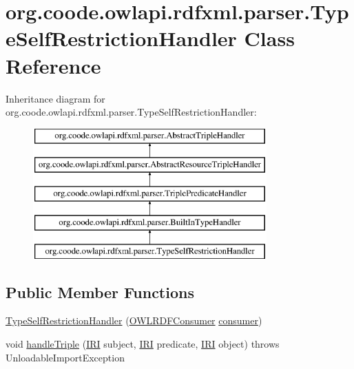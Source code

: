 \hypertarget{classorg_1_1coode_1_1owlapi_1_1rdfxml_1_1parser_1_1_type_self_restriction_handler}{\section{org.\-coode.\-owlapi.\-rdfxml.\-parser.\-Type\-Self\-Restriction\-Handler Class Reference}
\label{classorg_1_1coode_1_1owlapi_1_1rdfxml_1_1parser_1_1_type_self_restriction_handler}
}
Inheritance diagram for org.\-coode.\-owlapi.\-rdfxml.\-parser.\-Type\-Self\-Restriction\-Handler\-:\begin{figure}[H]
\begin{center}
\leavevmode
\includegraphics[height=5.000000cm]{classorg_1_1coode_1_1owlapi_1_1rdfxml_1_1parser_1_1_type_self_restriction_handler}
\end{center}
\end{figure}
\subsection*{Public Member Functions}
\begin{DoxyCompactItemize}
\item 
\hyperlink{classorg_1_1coode_1_1owlapi_1_1rdfxml_1_1parser_1_1_type_self_restriction_handler_a80de1c06b05c538309021a3f7d5b8492}{Type\-Self\-Restriction\-Handler} (\hyperlink{classorg_1_1coode_1_1owlapi_1_1rdfxml_1_1parser_1_1_o_w_l_r_d_f_consumer}{O\-W\-L\-R\-D\-F\-Consumer} \hyperlink{classorg_1_1coode_1_1owlapi_1_1rdfxml_1_1parser_1_1_abstract_triple_handler_a4ccf4d898ff01eb1cadfa04b23d54e9c}{consumer})
\item 
void \hyperlink{classorg_1_1coode_1_1owlapi_1_1rdfxml_1_1parser_1_1_type_self_restriction_handler_abfb83e9c0fa414233195bfd01c1c316a}{handle\-Triple} (\hyperlink{classorg_1_1semanticweb_1_1owlapi_1_1model_1_1_i_r_i}{I\-R\-I} subject, \hyperlink{classorg_1_1semanticweb_1_1owlapi_1_1model_1_1_i_r_i}{I\-R\-I} predicate, \hyperlink{classorg_1_1semanticweb_1_1owlapi_1_1model_1_1_i_r_i}{I\-R\-I} object)  throws Unloadable\-Import\-Exception 
\end{DoxyCompactItemize}
